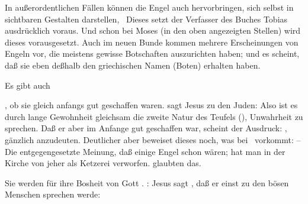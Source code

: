 \begin{aufza}
\begin{aufzb}
\item In außerordentlichen Fällen können die Engel auch  hervorbringen, sich selbst in sichtbaren Gestalten darstellen, \udgl\  Dieses setzt der Verfasser des Buches Tobias ausdrücklich voraus. Und schon bei Moses (in den oben angezeigten Stellen) wird dieses vorausgesetzt. Auch im neuen Bunde kommen mehrere Erscheinungen von Engeln vor, die meistens gewisse Botschaften auszurichten haben; und es scheint, daß sie eben deßhalb den griechischen Namen  (Boten) erhalten haben.~
\end{aufzb}
\item Es gibt auch
\begin{aufzb}
\item {}, ob sie gleich anfangs gut geschaffen waren.  sagt Jesus zu den Juden:  Also ist es durch lange Gewohnheit gleichsam die zweite Natur des Teufels (), Unwahrheit zu sprechen. Daß er aber im Anfange gut geschaffen war, scheint der Ausdruck: , gänzlich anzudeuten. Deutlicher aber beweiset dieses noch, was bei \ vorkommt:  -- Die entgegengesetzte Meinung, daß einige Engel schon  wären; hat man in der Kirche von jeher als Ketzerei verworfen.  glaubten das.
\item Sie werden für ihre Bosheit von Gott . :  Jesus sagt , daß er einst zu den bösen Menschen sprechen werde: 

\end{aufzb}
\end{aufza}
